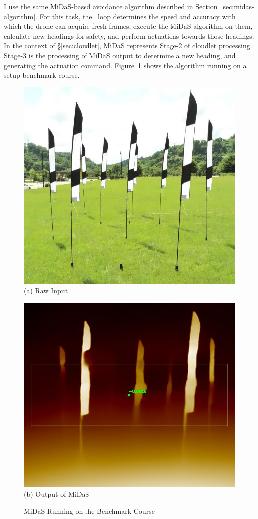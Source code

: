 I use the same MiDaS-based avoidance algorithm described in Section~\ref{sec:midas-algorithm}. For this task, the \ooda~loop determines the speed and accuracy with which the drone can acquire fresh frames, execute the MiDaS algorithm on them, calculate new headings for safety, and perform actuations towards those headings.  In the context of \S\ref{sec:cloudlet}, MiDaS represents Stage-2 of cloudlet processing.  Stage-3 is the processing of MiDaS output to determine a new heading, and generating the actuation command. Figure~\ref{fig:midas-sample-course} shows the algorithm running on a setup benchmark course.

\begin{figure}
	\begin{minipage}{0.495\linewidth}
		\centering
		\includegraphics[width=0.8\linewidth]{chapter6/FIGS/fig-obstacle-course-drone-pov.jpg}\\
		{(a) Raw Input}\\
	\end{minipage}
	\begin{minipage}{0.495\linewidth}
		\centering
		\includegraphics[width=0.8\linewidth]{chapter6/FIGS/fig-obstacle-course-midas.jpg}\\
		{(b) Output of MiDaS}\\
	\end{minipage}
\caption{MiDaS Running on the Benchmark Course}
\label{fig:midas-sample-course}
\end{figure}

